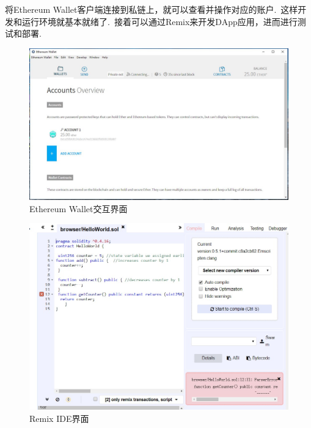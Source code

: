 \documentclass[a4paper,12pt,titlepage]{ctexart}
\begin{document}
将Ethereum Wallet客户端连接到私链上，就可以查看并操作对应的账户.~这样开发和运行环境就基本就绪了.~接着可以通过Remix来开发DApp应用，进而进行测试和部署.~
\begin{figure}[!hbp]
	\centering
	\includegraphics[scale=0.36]{fig15.jpg}
	\caption{Ethereum Wallet交互界面}
\end{figure}
\begin{figure}[!hbp]
	\centering
	\includegraphics[scale=0.50]{fig22.jpg}
	\caption{Remix IDE界面}
\end{figure}
\newpage
\end{document}
